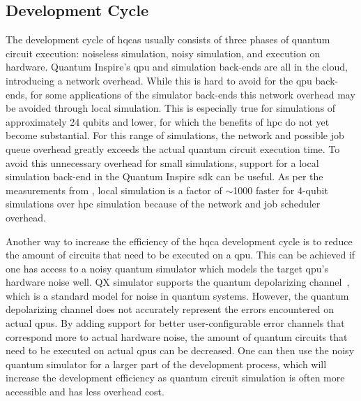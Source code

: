 \subsection{Development Cycle} \label{sec:dev-cycle}
The development cycle of \glspl{hqca} usually consists of three phases of quantum circuit execution: noiseless simulation, noisy simulation, and execution on hardware.
Quantum Inspire's \gls{qpu} and simulation back-ends are all in the cloud, introducing a network overhead.
While this is hard to avoid for the \gls{qpu} back-ends, for some applications of the simulator back-ends this network overhead may be avoided through local simulation.
This is especially true for simulations of approximately 24 qubits and lower, for which the benefits of \gls{hpc} do not yet become substantial.
For this range of simulations, the network and possible job queue overhead greatly exceeds the actual quantum circuit execution time.
To avoid this unnecessary overhead for small simulations, support for a local simulation back-end in the Quantum Inspire \gls{sdk} can be useful.
As per the measurements from , local simulation is a factor of $\sim$1000 faster for 4-qubit simulations over \gls{hpc} simulation because of the network and job scheduler overhead.

Another way to increase the efficiency of the \gls{hqca} development cycle is to reduce the amount of circuits that need to be executed on a \gls{qpu}.
This can be achieved if one has access to a noisy quantum simulator which models the target \gls{qpu}'s hardware noise well.
QX simulator supports the quantum depolarizing channel~\cite[Section 8.3.4]{nielsen2002quantum}, which is a standard model for noise in quantum systems.
However, the quantum depolarizing channel does not accurately represent the errors encountered on actual \glspl{qpu}.
By adding support for better user-configurable error channels that correspond more to actual hardware noise, the amount of quantum circuits that need to be executed on actual \glspl{qpu} can be decreased.
One can then use the noisy quantum simulator for a larger part of the development process, which will increase the development efficiency as quantum circuit simulation is often more accessible and has less overhead cost.


